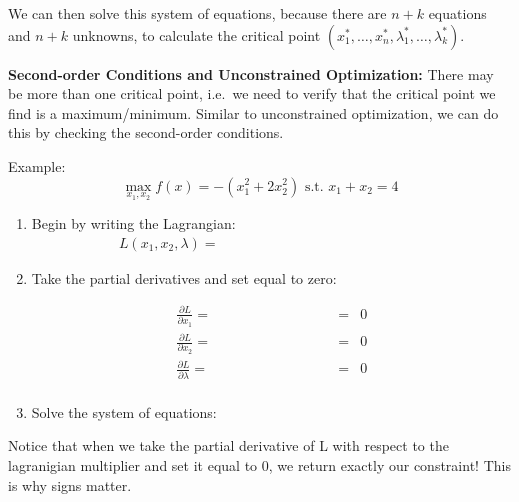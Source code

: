 \documentclass[]{book}
\theoremstyle{definition}
\theoremstyle{definition}
\theoremstyle{definition}
\theoremstyle{remark}
\begin{document}
We can then solve this system of equations, because there are \(n+k\)
equations and \(n+k\) unknowns, to calculate the critical point
\((x_1^*,\dots,x_n^*,\lambda_1^*,\dots,\lambda_k^*)\).

\textbf{Second-order Conditions and Unconstrained Optimization:} There
may be more than one critical point, i.e.~we need to verify that the
critical point we find is a maximum/minimum. Similar to unconstrained
optimization, we can do this by checking the second-order conditions.

Example:\\
\[\max_{x_1,x_2} f(x) = -(x_1^2 + 2x_2^2) \text{ s.t. } x_1 + x_2 = 4\]

\begin{enumerate}
\item Begin by writing the Lagrangian:
$$L(x_1, x_2, \lambda) =  \phantom{-(x_1^2 + 2x_2^2) - \lambda(x_1 + x_2 - 4)}$$
\item Take the partial derivatives and set equal to zero:

\begin{eqnarray*}
\frac{\partial L}{\partial x_1} = \phantom{-2x_1 - \lambda} \quad \quad \quad & = & 0\\
\frac{\partial L}{\partial x_2}  = \phantom{-4x_2 - \lambda} \quad \quad \quad & =  & 0\\
\frac{\partial L}{\partial \lambda} = \phantom{-(x_1 + x_2 - 4)} \quad & = & 0\\
\end{eqnarray*}

\item Solve the system of equations:
\vspace{10pt}
\end{enumerate}

Notice that when we take the partial derivative of L with respect to the
lagranigian multiplier and set it equal to 0, we return exactly our
constraint! This is why signs matter.
\end{document}
